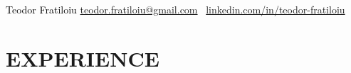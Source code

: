 \documentclass[paper=a4,fontsize=11pt]{scrartcl}
\newlength{\spacebox}
\newcommand{\sepspace}{\vspace*{0.35em}}		%
\newcommand{\MyName}[1]{ %
                \huge 
                #1 \hfill 
                \par \normalsize \normalfont}
\newcommand{\MySlogan}[1]{ %
		\Large 
		\text{#1} \hfill
		\par \normalsize \normalfont}
\newcommand{\NewPart}[1]{\section*{\uppercase{#1}}}
\newcommand{\PersonalEntry}[2]{
		\noindent\hangindent=2em\hangafter=0 %
		\parbox{\spacebox}{        %
		\textit{#1}}		       %
		\hspace{1.5em} #2 \par}    %
\begin{document}





\begin{adjustwidth}{-0.9in}{}
     	\textcolor{black}{
	\parbox[b][2.5cm][c]{21cm}{%
            \huge 
            \centering
            \vspace*{1cm}
            \hspace*{3.5cm}Teodor Fratiloiu
            \large
            \newline
            \href{mailto:teodor.fratiloiu@gmail.com}{teodor.fratiloiu@gmail.com} \textbar\
            \href{https://www.linkedin.com/in/teodor-fratiloiu/}{linkedin.com/in/teodor-fratiloiu}  
        }
}

\end{adjustwidth}

\NewPart{Experience}{}
\end{document}
